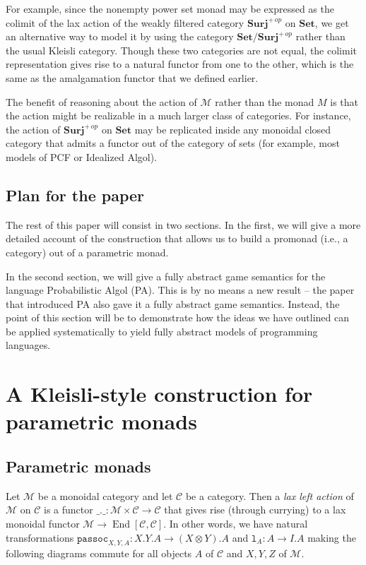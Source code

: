 \documentclass{svproc}
\newcommand\C{\mathcal{C}}
\newcommand\M{\mathcal{M}}
\DeclareMathOperator{\End}{End}
\newcommand{\passoc}{\texttt{passoc}}
\newcommand\tensor\otimes
\newcommand\lun{\texttt{l}}
\newcommand*\from{\colon}
\newcommand{\0}{{\mathtt{0}}} \newcommand{\com}{{\mathtt{com}}}
\newcommand{\catname}[1]{\mathbf{#1}}
\newcommand{\Set}{\catname{Set}}
\newcommand{\Surj}{\catname{Surj}}
\begin{document}
For example, since the nonempty power set monad may be expressed as the colimit of the lax action of the weakly filtered category $\Surj^{+\,op}$ on $\Set$, we get an alternative way to model it by using the category $\Set/\Surj^{+\,op}$ rather than the usual Kleisli category.  
Though these two categories are not equal, the colimit representation gives rise to a natural functor from one to the other, which is the same as the amalgamation functor that we defined earlier.

The benefit of reasoning about the action of $\M$ rather than the monad $M$ is that the action might be realizable in a much larger class of categories.  
For instance, the action of $\Surj^{+\,op}$ on $\Set$ may be replicated inside any monoidal closed category that admits a functor out of the category of sets (for example, most models of PCF or Idealized Algol).

\subsection{Plan for the paper}

The rest of this paper will consist in two sections.  
In the first, we will give a more detailed account of the construction that allows us to build a promonad (i.e., a category) out of a parametric monad.  

In the second section, we will give a fully abstract game semantics for the language Probabilistic Algol (PA).  
This is by no means a new result -- the paper \cite{DanosHarmer} that introduced PA also gave it a fully abstract game semantics.  
Instead, the point of this section will be to demonstrate how the ideas we have outlined can be applied systematically to yield fully abstract models of programming languages.

\section{A Kleisli-style construction for parametric monads}

\subsection{Parametric monads}

Let $\M$ be a monoidal category and let $\C$ be a category.  
Then a \emph{lax left action} of $\M$ on $\C$ is a functor $\_.\_\from \M\times\C\to \C$ that gives rise (through currying) to a lax monoidal functor $\M\to \End[\C,\C]$.  
In other words, we have natural transformations $\passoc_{X,Y,A}\from X.Y.A\to (X\tensor Y).A$ and $\lun_A\from A \to I.A$ making the following diagrams commute for all objects $A$ of $\C$ and $X,Y,Z$ of $\M$.
\end{document}
